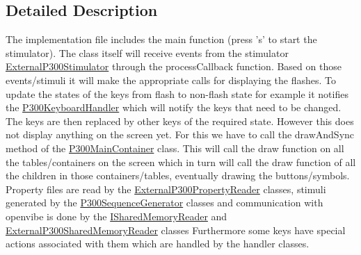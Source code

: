 \subsection{Detailed Description}
The implementation file includes the main function (press 's' to start the stimulator). The class itself will receive events from the stimulator \hyperlink{classOpenViBEApplications_1_1ExternalP300Stimulator}{ExternalP300Stimulator} through the processCallback function. Based on those events/stimuli it will make the appropriate calls for displaying the flashes. To update the states of the keys from flash to non-\/flash state for example it notifies the \hyperlink{classOpenViBEApplications_1_1P300KeyboardHandler}{P300KeyboardHandler} which will notify the keys that need to be changed. The keys are then replaced by other keys of the required state. However this does not display anything on the screen yet. For this we have to call the drawAndSync method of the \hyperlink{classOpenViBEApplications_1_1P300MainContainer}{P300MainContainer} class. This will call the draw function on all the tables/containers on the screen which in turn will call the draw function of all the children in those containers/tables, eventually drawing the buttons/symbols. Property files are read by the \hyperlink{classOpenViBEApplications_1_1ExternalP300PropertyReader}{ExternalP300PropertyReader} classes, stimuli generated by the \hyperlink{classOpenViBEApplications_1_1P300SequenceGenerator}{P300SequenceGenerator} classes and communication with openvibe is done by the \hyperlink{classOpenViBEApplications_1_1ISharedMemoryReader}{ISharedMemoryReader} and \hyperlink{classOpenViBEApplications_1_1ExternalP300SharedMemoryReader}{ExternalP300SharedMemoryReader} classes Furthermore some keys have special actions associated with them which are handled by the handler classes. 

